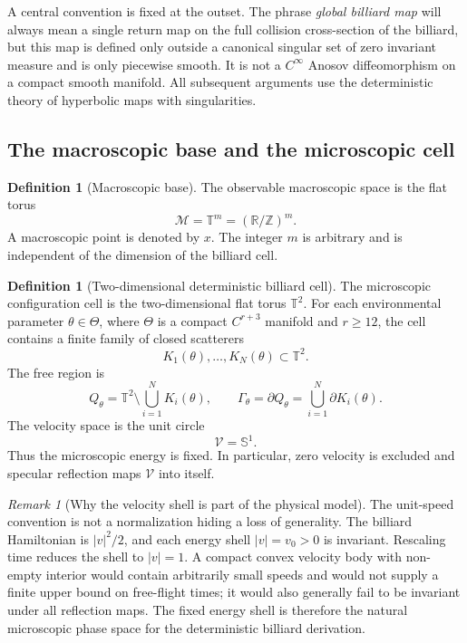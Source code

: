 \documentclass[12pt, letterpaper]{amsart}
\newcommand{\Mcal}{\mathcal{M}}
\newcommand{\R}{\mathbb{R}}
\newcommand{\Z}{\mathbb{Z}}
\newcommand{\T}{\mathbb{T}}
\newcommand{\Vcal}{\mathcal{V}}
\newcommand{\Thetacal}{\Theta}
\theoremstyle{plain}
\theoremstyle{definition}
\newtheorem{definition}[theorem]{Definition}
\theoremstyle{remark}
\newtheorem{remark}[theorem]{Remark}
\begin{document}
A central convention is fixed at the outset.  The phrase \emph{global billiard map} will always mean a single return map on the full collision cross-section of the billiard, but this map is defined only outside a canonical singular set of zero invariant measure and is only piecewise smooth.  It is not a $C^\infty$ Anosov diffeomorphism on a compact smooth manifold.  All subsequent arguments use the deterministic theory of hyperbolic maps with singularities.

\subsection{The macroscopic base and the microscopic cell}

\begin{definition}[Macroscopic base]
\label{def:macro_manifold}
The observable macroscopic space is the flat torus
\begin{equation}
    \Mcal=\T^m=(\R/\Z)^m .
\end{equation}
A macroscopic point is denoted by $x$.  The integer $m$ is arbitrary and is independent of the dimension of the billiard cell.
\end{definition}

\begin{definition}[Two-dimensional deterministic billiard cell]
\label{def:micro_cell}
The microscopic configuration cell is the two-dimensional flat torus $\T^2$.  For each environmental parameter $\theta\in\Thetacal$, where $\Thetacal$ is a compact $C^{r+3}$ manifold and $r\ge 12$, the cell contains a finite family of closed scatterers
\begin{equation}
    K_1(\theta),\ldots,K_N(\theta)\subset \T^2 .
\end{equation}
The free region is
\begin{equation}
    Q_\theta=\T^2\setminus\bigcup_{i=1}^N K_i(\theta),
    \qquad
    \Gamma_\theta=\partial Q_\theta=\bigcup_{i=1}^N \partial K_i(\theta).
\end{equation}
The velocity space is the unit circle
\begin{equation}
    \Vcal=\mathbb S^1.
\end{equation}
Thus the microscopic energy is fixed.  In particular, zero velocity is excluded and specular reflection maps $\Vcal$ into itself.
\end{definition}

\begin{remark}[Why the velocity shell is part of the physical model]
The unit-speed convention is not a normalization hiding a loss of generality.  The billiard Hamiltonian is $|v|^2/2$, and each energy shell $|v|=v_0>0$ is invariant.  Rescaling time reduces the shell to $|v|=1$.  A compact convex velocity body with non-empty interior would contain arbitrarily small speeds and would not supply a finite upper bound on free-flight times; it would also generally fail to be invariant under all reflection maps.  The fixed energy shell is therefore the natural microscopic phase space for the deterministic billiard derivation.
\end{remark}
\end{document}
